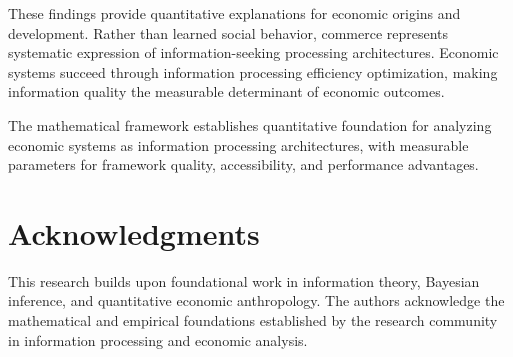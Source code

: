 \documentclass[12pt,a4paper]{article}
\begin{document}
These findings provide quantitative explanations for economic origins and development. Rather than learned social behavior, commerce represents systematic expression of information-seeking processing architectures. Economic systems succeed through information processing efficiency optimization, making information quality the measurable determinant of economic outcomes.

The mathematical framework establishes quantitative foundation for analyzing economic systems as information processing architectures, with measurable parameters for framework quality, accessibility, and performance advantages.

\section*{Acknowledgments}

This research builds upon foundational work in information theory, Bayesian inference, and quantitative economic anthropology. The authors acknowledge the mathematical and empirical foundations established by the research community in information processing and economic analysis.
\end{document}
